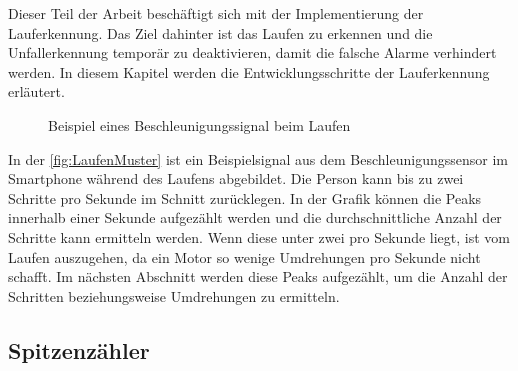 Dieser Teil der Arbeit beschäftigt sich mit der Implementierung der Lauferkennung. Das Ziel dahinter ist das Laufen zu erkennen und die Unfallerkennung temporär zu deaktivieren, damit die falsche Alarme verhindert werden.
In diesem Kapitel werden die Entwicklungsschritte der Lauferkennung erläutert.

%

\begin{figure}
	\centering
	\caption{Beispiel eines Beschleunigungssignal beim Laufen}
	\label{fig:LaufenMuster}
\end{figure}
In der \autoref{fig:LaufenMuster} ist ein Beispielsignal aus dem Beschleunigungssensor im Smartphone während des Laufens abgebildet. Die Person kann bis zu zwei Schritte pro Sekunde im Schnitt zurücklegen. In der Grafik können die Peaks innerhalb einer Sekunde aufgezählt werden und die durchschnittliche Anzahl der Schritte kann ermitteln werden. Wenn diese unter zwei pro Sekunde liegt, ist vom Laufen auszugehen, da ein Motor so wenige Umdrehungen pro Sekunde nicht schafft. Im nächsten Abschnitt werden diese Peaks aufgezählt, um die Anzahl der Schritten beziehungsweise Umdrehungen zu ermitteln.
%
\subsection{Spitzenzähler} \label{abs:PeaksAufzaehlen} %

